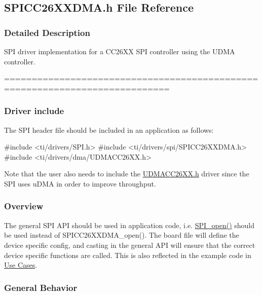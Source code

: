 \subsection{S\+P\+I\+C\+C26\+X\+X\+D\+M\+A.\+h File Reference}
\label{_s_p_i_c_c26_x_x_d_m_a_8h}


\subsubsection{Detailed Description}
S\+P\+I driver implementation for a C\+C26\+X\+X S\+P\+I controller using the U\+D\+M\+A controller. 

============================================================================

\subsubsection*{Driver include}

The S\+P\+I header file should be included in an application as follows\+: 
\begin{DoxyCode}
\textcolor{preprocessor}{#include <ti/drivers/SPI.h>}
\textcolor{preprocessor}{#include <ti/drivers/spi/SPICC26XXDMA.h>}
\textcolor{preprocessor}{#include <ti/drivers/dma/UDMACC26XX.h>}
\end{DoxyCode}
 Note that the user also needs to include the \hyperlink{_u_d_m_a_c_c26_x_x_8h}{U\+D\+M\+A\+C\+C26\+X\+X.\+h} driver since the S\+P\+I uses u\+D\+M\+A in order to improve throughput.

\subsubsection*{Overview}

The general S\+P\+I A\+P\+I should be used in application code, i.\+e. \hyperlink{_s_p_i_8h_a62cfe494cb1df47cd602e8747e894fd1}{S\+P\+I\+\_\+open()} should be used instead of S\+P\+I\+C\+C26\+X\+X\+D\+M\+A\+\_\+open(). The board file will define the device specific config, and casting in the general A\+P\+I will ensure that the correct device specific functions are called. This is also reflected in the example code in \hyperlink{_s_p_i_c_c26_x_x_d_m_a_8h_USE_CASES_SPI}{Use Cases}.

\subsubsection*{General Behavior}

